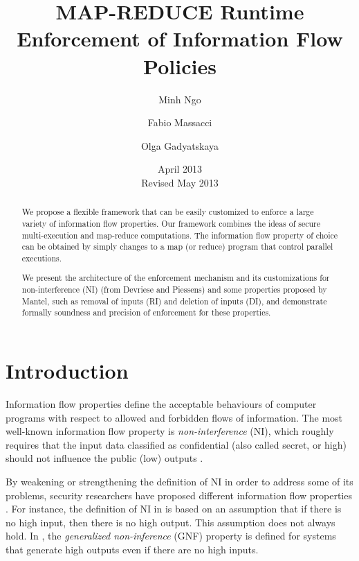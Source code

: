 \documentclass[10pt,a4paper,oneside]{article}
\begin{document}
\title{MAP-REDUCE Runtime Enforcement of Information Flow Policies}





\author{Minh Ngo}
\author{Fabio Massacci}
\author{Olga Gadyatskaya}

\date{April 2013\\Revised May 2013}


\maketitle


\pagestyle{plain}     \enlargethispage{4ex} 

\begin{abstract}
We propose a flexible framework that can be easily customized to enforce a large variety of information flow properties. Our framework combines the ideas of secure multi-execution and map-reduce computations. The information flow property of choice can be obtained by simply changes to a map (or reduce) program that control parallel executions.

We present the architecture of the enforcement mechanism and its customizations for non-interference (NI) (from Devriese and Piessens) and some properties proposed by Mantel, such as removal of inputs (RI) and deletion of inputs (DI), and demonstrate formally soundness and precision of enforcement for these properties.
\end{abstract}


\section{Introduction}\label{sec:introduction}
Information flow properties define the acceptable behaviours of computer programs with respect to allowed and forbidden flows of information. The most well-known information flow property is \emph{non-interference} (NI), which roughly requires that the input data classified as confidential (also called secret, or high) should not influence the public (low) outputs \cite{Gogu-Mese-82-IEEESP,Devr-Pies-10-IEEESP}. 


By weakening or strengthening the definition of NI in order to address some of its problems, security researchers have proposed different information flow properties \cite{MANT-00-CSF,McCu-87-SP,Guttman-Nadel-88-CSF,McLe-94-SP,ZAKI-LEE-97-SP}. For instance, the definition of NI in \cite{Gogu-Mese-82-IEEESP} is based on an assumption that if there is no high input, then there is no high output. This assumption does not always hold. In \cite{McLe-94-SP}, the \emph{generalized non-inference} (GNF) property is defined for systems that generate high outputs even if there are no high inputs.
\end{document}
